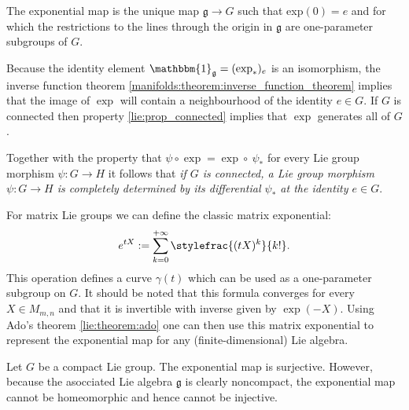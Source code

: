     \begin{property}
        The exponential map is the unique map $\mathfrak{g}\rightarrow G$ such that exp$(0) = e$ and for which the restrictions to the lines through the origin in $\mathfrak{g}$ are one-parameter subgroups of $G$.
    \end{property}
    \begin{result}\label{lie:exp_result}
        Because the identity element $\mathbbm{1}_\mathfrak{g} = (\exp_\ast)_e$ is an isomorphism, the inverse function theorem \ref{manifolds:theorem:inverse_function_theorem} implies that the image of $\exp$ will contain a neighbourhood of the identity $e\in G$. If $G$ is connected then property \ref{lie:prop_connected} implies that $\exp$ generates all of $G$.

        Together with the property that $\psi\circ\exp = \exp\circ\ \psi_\ast$ for every Lie group morphism $\psi:G\rightarrow H$ it follows that \textit{if $G$ is connected, a Lie group morphism $\psi:G\rightarrow H$ is completely determined by its differential $\psi_\ast$ at the identity $e\in G$}.
    \end{result}

    \begin{example}
        For matrix Lie groups we can define the classic matrix exponential:
        \begin{gather}
            e^{tX} := \sum_{k=0}^{+\infty}\stylefrac{(tX)^k}{k!}.
        \end{gather}
        This operation defines a curve $\gamma(t)$ which can be used as a one-parameter subgroup on $G$. It should be noted that this formula converges for every $X\in M_{m,n}$ and that it is invertible with inverse given by $\exp(-X)$. Using Ado's theorem \ref{lie:theorem:ado} one can then use this matrix exponential to represent the exponential map for any (finite-dimensional) Lie algebra.
    \end{example}

    \begin{remark}
        Let $G$ be a compact Lie group. The exponential map is surjective. However, because the asocciated Lie algebra $\mathfrak{g}$ is clearly noncompact, the exponential map cannot be homeomorphic and hence cannot be injective.
    \end{remark}

